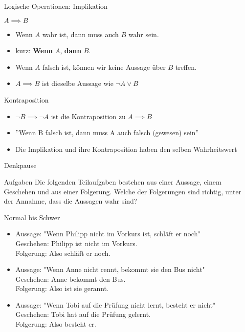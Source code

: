 \begin{frame}{Logische Operationen: Implikation}
	\begin{alertblock}{$A\implies B$}
		\begin{itemize}
			\item \glqq Wenn $A$ wahr ist, dann muss auch $B$ wahr sein.\grqq
			\item kurz: \glqq\textbf{Wenn} $A$, \textbf{dann} $B$.\grqq
			\item Wenn $A$ falsch ist, können wir keine Aussage über $B$ treffen.
			\item $A\implies B$ ist dieselbe Aussage wie $\neg A \vee B$
		\end{itemize}
	\end{alertblock}
	 {
		\begin{exampleblock}{Kontraposition}
			\begin{itemize}
				\item $\lnot B\implies \lnot A$ ist die Kontraposition zu $A \implies B$
				\item ''Wenn B falsch ist, dann muss A auch falsch (gewesen) sein''
				\item Die Implikation und ihre Kontraposition haben den selben Wahrheitswert
			\end{itemize}
		\end{exampleblock}
	}
\end{frame}

{
\begin{frame}{Denkpause}
	\begin{alertblock}{Aufgaben}
		Die folgenden Teilaufgaben bestehen aus einer Aussage, einem Geschehen und aus einer Folgerung. Welche der Folgerungen sind richtig, unter der Annahme,
		dass die Aussagen wahr sind?
	\end{alertblock}
	\begin{block}{Normal bis Schwer}
		\begin{itemize}
			\item Aussage: "Wenn Philipp nicht im Vorkurs ist, schläft er noch"\\
			      Geschehen: Philipp ist nicht im Vorkurs.\\
			      Folgerung: Also schläft er noch.
			\item Aussage: "Wenn Anne nicht rennt, bekommt sie den Bus nicht"\\
			      Geschehen: Anne bekommt den Bus.\\
			      Folgerung: Also ist sie gerannt.
			\item Aussage: "Wenn Tobi auf die Prüfung nicht lernt, besteht er nicht"\\
			      Geschehen: Tobi hat auf die Prüfung gelernt.\\
			      Folgerung: Also besteht er.
		\end{itemize}
	\end{block}
\end{frame}
}


